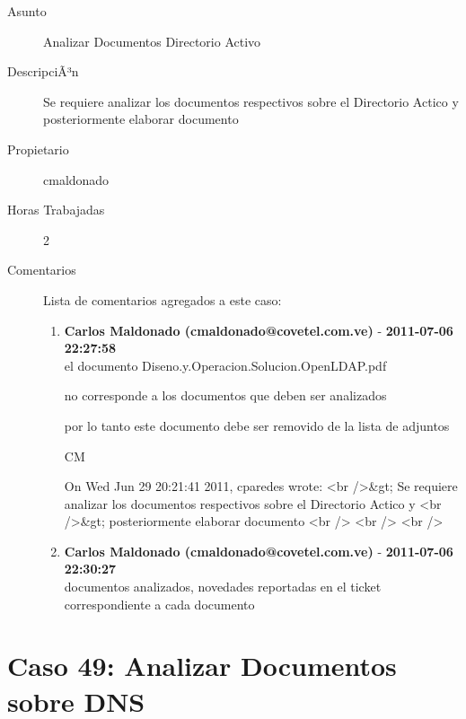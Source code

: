 \begin{description}

\item[Asunto] Analizar Documentos Directorio Activo\item[DescripciÃ³n] Se requiere analizar los documentos respectivos sobre el Directorio Actico y
posteriormente elaborar documento\item[Propietario] cmaldonado\item[Horas Trabajadas] 2

\item[Comentarios] Lista de comentarios agregados a este caso:  
\begin{enumerate}
        \item {\bfseries Carlos Maldonado (cmaldonado@covetel.com.ve)  } - {\bfseries 2011-07-06 22:27:58} \\ el documento Diseno.y.Operacion.Solucion.OpenLDAP.pdf

no corresponde a los documentos que deben ser analizados

por lo tanto este documento debe ser removido de la lista de adjuntos

CM


On Wed Jun 29 20:21:41 2011, cparedes wrote:
<br />&gt; Se requiere analizar los documentos respectivos sobre el Directorio
Actico y
<br />&gt; posteriormente elaborar documento
<br />
<br />
<br />        \item {\bfseries Carlos Maldonado (cmaldonado@covetel.com.ve)  } - {\bfseries 2011-07-06 22:30:27} \\ documentos analizados, novedades reportadas en el ticket correspondiente a cada documento    \end{enumerate}

\end{description}

\section{Caso 49: Analizar Documentos sobre DNS }

